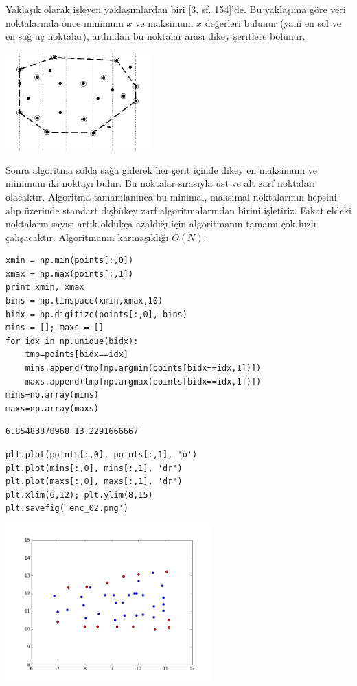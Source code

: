 \documentclass[12pt,fleqn]{article}\usepackage{../../common}
\begin{document}
Yaklaşık olarak işleyen yaklaşımlardan biri [3, sf. 154]'de. Bu yaklaşıma
göre veri noktalarında önce minimum $x$ ve maksimum $x$ değerleri bulunur
(yani en sol ve en sağ uç noktalar), ardından bu noktalar arası dikey
şeritlere bölünür.

\includegraphics[width=15em]{enc_03.png}

Sonra algoritma solda sağa giderek her şerit içinde dikey en maksimum ve
minimum iki noktayı bulur. Bu noktalar sırasıyla üst ve alt zarf noktaları
olacaktır. Algoritma tamamlanınca bu minimal, maksimal noktalarının hepsini
alıp üzerinde standart dışbükey zarf algoritmalarından birini
işletiriz. Fakat eldeki noktaların sayısı artık oldukça azaldığı için
algoritmanın tamamı çok hızlı çalışacaktır. Algoritmanın karmaşıklığı
$O(N)$.

\begin{verbatim}
xmin = np.min(points[:,0])
xmax = np.max(points[:,1])
print xmin, xmax
bins = np.linspace(xmin,xmax,10)
bidx = np.digitize(points[:,0], bins)
mins = []; maxs = []
for idx in np.unique(bidx):
    tmp=points[bidx==idx]
    mins.append(tmp[np.argmin(points[bidx==idx,1])])
    maxs.append(tmp[np.argmax(points[bidx==idx,1])])
mins=np.array(mins)
maxs=np.array(maxs)
\end{verbatim}

\begin{verbatim}
6.85483870968 13.2291666667
\end{verbatim}

\begin{verbatim}
plt.plot(points[:,0], points[:,1], 'o')
plt.plot(mins[:,0], mins[:,1], 'dr')
plt.plot(maxs[:,0], maxs[:,1], 'dr')
plt.xlim(6,12); plt.ylim(8,15)
plt.savefig('enc_02.png')
\end{verbatim}

\includegraphics[height=6cm]{enc_02.png}
\end{document}
